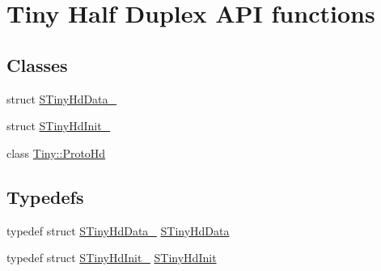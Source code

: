 \hypertarget{group__HALF__DUPLEX__API}{}\section{Tiny Half Duplex A\+PI functions}
\label{group__HALF__DUPLEX__API}
\subsection*{Classes}
\begin{DoxyCompactItemize}
\item 
struct \hyperlink{structSTinyHdData__}{S\+Tiny\+Hd\+Data\+\_\+}
\item 
struct \hyperlink{structSTinyHdInit__}{S\+Tiny\+Hd\+Init\+\_\+}
\item 
class \hyperlink{classTiny_1_1ProtoHd}{Tiny\+::\+Proto\+Hd}
\end{DoxyCompactItemize}
\subsection*{Typedefs}
\begin{DoxyCompactItemize}
\item 
typedef struct \hyperlink{structSTinyHdData__}{S\+Tiny\+Hd\+Data\+\_\+} \hyperlink{group__HALF__DUPLEX__API_gaf9f81ad129b754a780dfca5dcd7f7cf9}{S\+Tiny\+Hd\+Data}
\item 
typedef struct \hyperlink{structSTinyHdInit__}{S\+Tiny\+Hd\+Init\+\_\+} \hyperlink{group__HALF__DUPLEX__API_ga784f1a0f0ae7f06da4bc288fa3f22408}{S\+Tiny\+Hd\+Init}
\end{DoxyCompactItemize}
